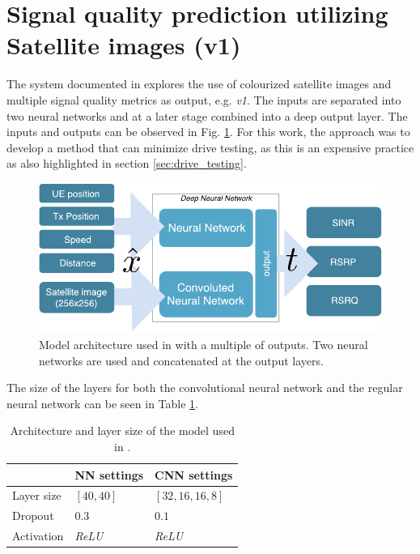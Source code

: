 \section{Signal quality prediction utilizing Satellite images (v1)}\label{sec:initial_v1}
The system documented in \cite{Thrane2018DriveApproximation} explores the use of colourized satellite images and multiple signal quality metrics as output, e.g. \emph{v1}. The inputs are separated into two neural networks and at a later stage combined into a deep output layer. The inputs and outputs can be observed in Fig. \ref{fig:dnn_architecture_drive_test_minimization}. For this work, the approach was to develop a method that can minimize drive testing, as this is an expensive practice as also highlighted in section \ref{sec:drive_testing}.

\begin{figure}
    \centering
    \includegraphics{chapters/part_pathloss/drive_test_minimzation_paper/input_output_figure.pdf}
    \caption{Model architecture used in \cite{Thrane2018DriveApproximation} with a multiple of outputs. Two neural networks are used and concatenated at the output layers.}
    \label{fig:dnn_architecture_drive_test_minimization}
\end{figure}

The size of the layers for both the convolutional neural network and the regular neural network can be seen in Table \ref{tab:dnn_architecture_drive_test_minimization}.

\begin{table}[ht]
  \centering
  \caption{Architecture and layer size of the model used in \cite{Thrane2018DriveApproximation}.}
  \label{tab:dnn_architecture_drive_test_minimization}
  \begin{tabular}{l|l|l}
                & NN settings     & CNN settings      \\ \hline
  Layer size & $[40, 40]$      & $[32, 16, 16, 8]$ \\
  Dropout       & $0.3$           & $0.1$             \\
  Activation    & \textit{ReLU} & \textit{ReLU}  
\end{tabular}
\end{table}

